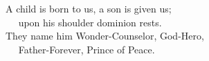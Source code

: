 
\lettrine{A}{} child is born to us, a son is given us;\\
   upon his shoulder dominion rests.\\
They name him Wonder-Counselor, God-Hero,\\
   Father-Forever, Prince of Peace.